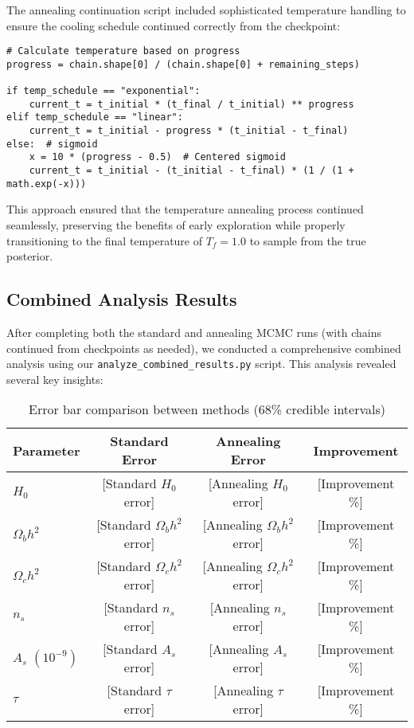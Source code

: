 \documentclass[11pt]{article}
\theoremstyle{definition}
\begin{document}
The annealing continuation script included sophisticated temperature handling to ensure the cooling schedule continued correctly from the checkpoint:

\begin{verbatim}
# Calculate temperature based on progress
progress = chain.shape[0] / (chain.shape[0] + remaining_steps)

if temp_schedule == "exponential":
    current_t = t_initial * (t_final / t_initial) ** progress
elif temp_schedule == "linear":
    current_t = t_initial - progress * (t_initial - t_final)
else:  # sigmoid
    x = 10 * (progress - 0.5)  # Centered sigmoid
    current_t = t_initial - (t_initial - t_final) * (1 / (1 + math.exp(-x)))
\end{verbatim}

This approach ensured that the temperature annealing process continued seamlessly, preserving the benefits of early exploration while properly transitioning to the final temperature of $T_f = 1.0$ to sample from the true posterior.

\subsection{Combined Analysis Results}

After completing both the standard and annealing MCMC runs (with chains continued from checkpoints as needed), we conducted a comprehensive combined analysis using our \texttt{analyze\_combined\_results.py} script. This analysis revealed several key insights:

\begin{table}[h!]
  \centering
  \small
  \caption{Error bar comparison between methods (68\% credible intervals)}
  \label{tab:error-comparison}
  \begin{tabular}{l c c c}
    \toprule
    \textbf{Parameter} & \textbf{Standard Error} & \textbf{Annealing Error} & \textbf{Improvement} \\
    \midrule
    $H_0$ & [Standard $H_0$ error] & [Annealing $H_0$ error] & [Improvement \%] \\
    $\Omega_b h^2$ & [Standard $\Omega_b h^2$ error] & [Annealing $\Omega_b h^2$ error] & [Improvement \%] \\
    $\Omega_c h^2$ & [Standard $\Omega_c h^2$ error] & [Annealing $\Omega_c h^2$ error] & [Improvement \%] \\
    $n_s$ & [Standard $n_s$ error] & [Annealing $n_s$ error] & [Improvement \%] \\
    $A_s$ $(10^{-9})$ & [Standard $A_s$ error] & [Annealing $A_s$ error] & [Improvement \%] \\
    $\tau$ & [Standard $\tau$ error] & [Annealing $\tau$ error] & [Improvement \%] \\
    \bottomrule
  \end{tabular}
\end{table}
\end{document}
